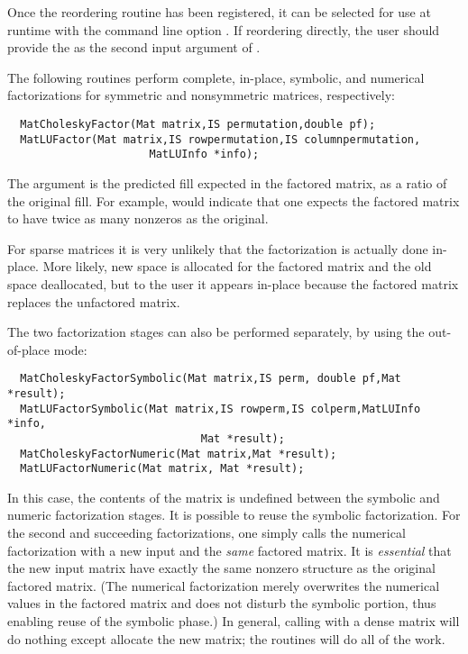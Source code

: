 Once the reordering routine has been registered,
it can be selected for use at runtime with the
command line option .  If reordering directly,
the user should provide the  as the second input argument of
.

The following routines perform complete, in-place, symbolic, and numerical 
factorizations for symmetric and nonsymmetric matrices, respectively:
\begin{verbatim}
  MatCholeskyFactor(Mat matrix,IS permutation,double pf);
  MatLUFactor(Mat matrix,IS rowpermutation,IS columnpermutation,
                      MatLUInfo *info); 
\end{verbatim}
The argument  is the predicted fill
expected in the factored matrix, as a ratio of the original fill. 
For example,  would indicate that one expects the factored
matrix to have twice as many nonzeros as the original.
 

For sparse matrices it is very unlikely that the factorization 
is actually done in-place. More likely, new space is allocated 
for the factored matrix and the old space deallocated, but to the 
user it appears in-place because the factored matrix replaces
the unfactored matrix.

The 
two  
factorization 
stages  
can also be performed separately, by using the out-of-place mode:
\begin{verbatim}
  MatCholeskyFactorSymbolic(Mat matrix,IS perm, double pf,Mat *result);
  MatLUFactorSymbolic(Mat matrix,IS rowperm,IS colperm,MatLUInfo *info,
                              Mat *result);
  MatCholeskyFactorNumeric(Mat matrix,Mat *result);
  MatLUFactorNumeric(Mat matrix, Mat *result);
\end{verbatim}
In this case, the contents of the matrix  is undefined between 
the symbolic and numeric factorization stages. 
It is possible to reuse the symbolic factorization. For the second and 
succeeding factorizations, one simply calls the numerical factorization with a 
new input  and the {\em same} factored  matrix.
It is {\em essential} that the new input matrix 
have   %
exactly the same nonzero structure as the original factored matrix.
(The numerical factorization merely overwrites the numerical values in the 
factored matrix and does not disturb the symbolic portion, thus enabling
reuse of the symbolic phase.)
In general, calling  with a dense matrix will 
do nothing except allocate the new matrix; the  
routines will do all of the work. 

